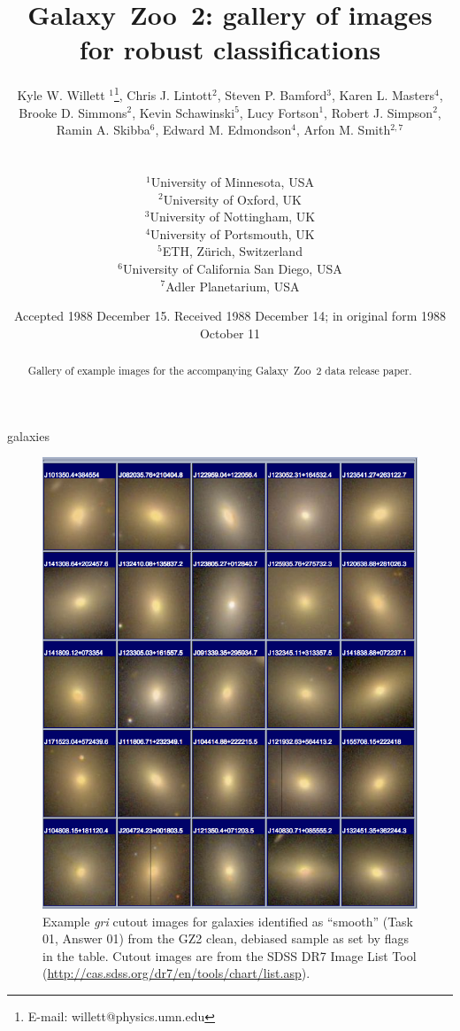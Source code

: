 \documentclass[useAMS,usenatbib]{mn2e}
\title[GZ2 gallery]{Galaxy~Zoo~2: gallery of images for robust classifications}
\author[Willett et al.]{
  \parbox[t]{16cm}{
  Kyle W. Willett $^{1}$\thanks{E-mail: willett@physics.umn.edu},
  Chris J. Lintott$^{2}$,
  Steven P. Bamford$^{3}$,
  Karen L. Masters$^{4}$,
  Brooke D. Simmons$^{2}$,
  Kevin Schawinski$^{5}$,
  Lucy Fortson$^{1}$,
  Robert J. Simpson$^{2}$,
  Ramin A. Skibba$^{6}$,
  Edward M. Edmondson$^{4}$,
  Arfon M. Smith$^{2,7}$\\
  }\\
$^{1}$University of Minnesota, USA \\
$^{2}$University of Oxford, UK \\
$^{3}$University of Nottingham, UK \\
$^{4}$University of Portsmouth, UK \\
$^{5}$ETH, Z\"urich, Switzerland \\
$^{6}$University of California San Diego, USA \\
$^{7}$Adler Planetarium, USA \\
}
\begin{document}
\date{Accepted 1988 December 15. Received 1988 December 14; in original form 1988 October 11}

\pagerange{\pageref{firstpage}--\pageref{lastpage}} 

\maketitle

\label{firstpage}

\begin{abstract}
Gallery of example images for the accompanying Galaxy~Zoo~2 data release paper. 
\end{abstract}

\begin{keywords}
galaxies
\end{keywords}

\newpage
\clearpage
\begin{figure}
\includegraphics[angle=0,width=7.0in]{figures/gallery/smooth.png}
\caption{Example {\it gri} cutout images for galaxies identified as ``smooth'' (Task 01, Answer 01) from the GZ2 clean, debiased sample as set by flags in the table. Cutout images are from the SDSS DR7 Image List Tool (\url{http://cas.sdss.org/dr7/en/tools/chart/list.asp}).  
\label{fig1}}
\end{figure}
\end{document}
